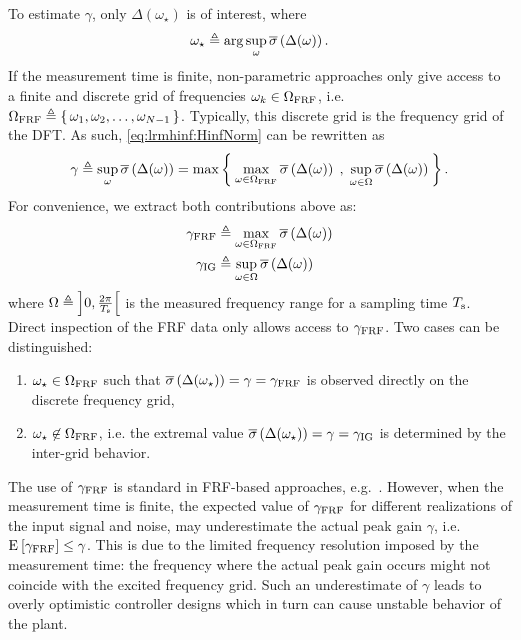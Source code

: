 To estimate $\gamma$, only $\Delta(\omega_{\star})$ is of interest, where
\begin{equation}
 \omega_{\star} 
     \triangleq 
       \arg
         \sup_{\omega} 
            \overline{\sigma} \left( \Delta(\omega) \right) 
  \text{.}
  \label{eq:lrmhinf:omega-star}
\end{equation}
If the measurement time is finite, non-parametric approaches only give access to a finite and discrete grid of frequencies $\omega_k \in \Omega_{\mathrm{FRF}} $, i.e. $\Omega_{\mathrm{FRF}} \triangleq \set{\omega_1, \omega_2, \ldots, \omega_{N-1}}$.
Typically, this discrete grid is the frequency grid of the \gls{DFT}.
As such, \eqref{eq:lrmhinf:HinfNorm} can be rewritten as
\begin{equation}
  \gamma \triangleq 
    \sup_{\omega} 
       \overline{\sigma} \left( \Delta(\omega) \right) 
         = \max 
             \Set{
                \max_{\omega \in \ensuremath{\Omega_{\mathrm{FRF}}}} 
                  \ensuremath{ \overline{\sigma} \left( \Delta(\omega) \right) }
                \;,\;
                \sup_{\omega \in \ensuremath{\Omega}} 
                  \ensuremath{ \overline{\sigma} \left( \Delta(\omega) \right) }
                }
  \label{eq:lrmhinf:gamma-split-grid}
  \text{.}
\end{equation}
For convenience, we extract both contributions above as:
\begin{align}
  \gamma_{\mathrm{FRF}} & \triangleq 
    \max_{\omega \in \Omega_{\mathrm{FRF}}  } 
       \overline{\sigma} \left( \Delta(\omega) \right) 
  \label{eq:lrmhinf:gamma:atGrid}\\
  \gamma_{\mathrm{IG}} & \triangleq 
    \sup_{\omega \in \Omega} 
       \overline{\sigma} \left( \Delta(\omega) \right) 
   \label{eq:lrmhinf:gamma:interGrid}
\end{align}
where $\Omega \triangleq \left] 0,\frac{2\pi}{T_{\mathrm{s}}} \right[$ is the measured frequency range for a sampling time $T_{\mathrm{s}}$.
Direct inspection of the \gls{FRF} data only allows access to $\gamma_{\mathrm{FRF}}$.
Two cases can be distinguished:
\begin{enumerate}
  \item $\omega_{\star} \in \Omega_{\mathrm{FRF}}$ such that $ \overline{\sigma} \left( \Delta(\omega_{\star}) \right)  = \gamma =\gamma_{\mathrm{FRF}}$ is observed directly on the discrete frequency grid,
  \item $\omega_{\star} \not\in \Omega_{\mathrm{FRF}}$, i.e. the extremal value $ \overline{\sigma} \left( \Delta(\omega_{\star}) \right)   = \gamma = \gamma_{\mathrm{IG}}$ is determined by the inter-grid behavior.
\end{enumerate}

The use of $\gamma_{\mathrm{FRF}}$ is standard in \gls{FRF}-based approaches, e.g.~\citet{vandeWal2002}.
However, when the measurement time is finite, the expected value of  $\gamma_{\mathrm{FRF}}$  for different realizations of the input signal and noise, may underestimate the actual peak gain $\gamma$, i.e. $\operatorname{\mathrm{E}}_{} \left[ \gamma_{\mathrm{FRF}} \right] \leq \gamma$.
This is due to the limited frequency resolution imposed by the measurement time: the frequency where the actual peak gain occurs might not coincide with the excited frequency grid.
Such an underestimate of $\gamma$ leads to overly optimistic controller designs which in turn can cause unstable behavior of the plant.

